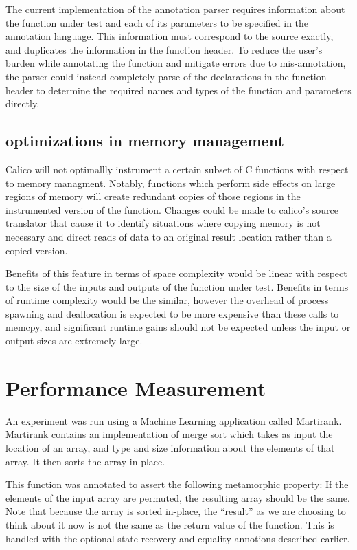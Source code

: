 \documentclass[notitlepage]{article}
\begin{document}
The current implementation of the annotation parser requires information about the function under test and each of its parameters to be specified in the annotation language. This information must correspond to the source exactly, and duplicates the information in the function header. To reduce the user's burden while annotating the function and mitigate errors due to mis-annotation, the parser could instead completely parse of the declarations in the function header to determine the required names and types of the function and parameters directly.

\subsection{optimizations in memory management}

Calico will not optimallly instrument a certain subset of C functions with respect to memory managment. Notably, functions which perform side effects on large regions of memory will create redundant copies of those regions in the instrumented version of the function. Changes could be made to calico's source translator that cause it to identify situations where copying memory is not necessary and direct reads of data to an original result location rather than a copied version.

Benefits of this feature in terms of space complexity would be linear with respect to the size of the inputs and outputs of the function under test. Benefits in terms of runtime complexity would be the similar, however the overhead of process spawning and deallocation is expected to be more expensive than these calls to memcpy, and significant runtime gains should not be expected unless the input or output sizes are extremely large.

\section{Performance Measurement}

An experiment was run using a Machine Learning application called Martirank. Martirank contains an implementation of merge sort which takes as input the location of an array, and type and size information about the elements of that array. It then sorts the array in place.

This function was annotated to assert the following metamorphic property: If the elements of the input array are permuted, the resulting array should be the same. Note that because the array is sorted in-place, the ``result'' as we are choosing to think about it now is not the same as the return value of the function. This is handled with the optional state recovery and equality annotions described earlier.
\end{document}
